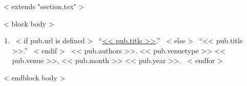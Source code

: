 ~< extends "section.tex" >~

~< block body >~
  \begin{enumerate}
    ~< for pub in items >~
      \item{
        ~< if pub.url is defined >~
          ``\href{<< pub.url >>}{<< pub.title >>}.''
        ~< else >~
          ``<< pub.title >>.''
        ~< endif >~
        << pub.authors >>.
        << pub.venuetype >>
        << pub.venue >>,
        << pub.month >>
        << pub.year >>.
      }
    ~< endfor >~
  \end{enumerate}
~< endblock body >~
